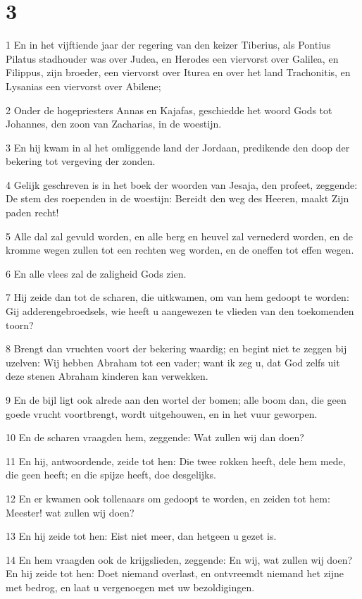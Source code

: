 \chapter{3}

\par 1 En in het vijftiende jaar der regering van den keizer Tiberius, als Pontius Pilatus stadhouder was over Judea, en Herodes een viervorst over Galilea, en Filippus, zijn broeder, een viervorst over Iturea en over het land Trachonitis, en Lysanias een viervorst over Abilene;
\par 2 Onder de hogepriesters Annas en Kajafas, geschiedde het woord Gods tot Johannes, den zoon van Zacharias, in de woestijn.
\par 3 En hij kwam in al het omliggende land der Jordaan, predikende den doop der bekering tot vergeving der zonden.
\par 4 Gelijk geschreven is in het boek der woorden van Jesaja, den profeet, zeggende: De stem des roependen in de woestijn: Bereidt den weg des Heeren, maakt Zijn paden recht!
\par 5 Alle dal zal gevuld worden, en alle berg en heuvel zal vernederd worden, en de kromme wegen zullen tot een rechten weg worden, en de oneffen tot effen wegen.
\par 6 En alle vlees zal de zaligheid Gods zien.
\par 7 Hij zeide dan tot de scharen, die uitkwamen, om van hem gedoopt te worden: Gij adderengebroedsels, wie heeft u aangewezen te vlieden van den toekomenden toorn?
\par 8 Brengt dan vruchten voort der bekering waardig; en begint niet te zeggen bij uzelven: Wij hebben Abraham tot een vader; want ik zeg u, dat God zelfs uit deze stenen Abraham kinderen kan verwekken.
\par 9 En de bijl ligt ook alrede aan den wortel der bomen; alle boom dan, die geen goede vrucht voortbrengt, wordt uitgehouwen, en in het vuur geworpen.
\par 10 En de scharen vraagden hem, zeggende: Wat zullen wij dan doen?
\par 11 En hij, antwoordende, zeide tot hen: Die twee rokken heeft, dele hem mede, die geen heeft; en die spijze heeft, doe desgelijks.
\par 12 En er kwamen ook tollenaars om gedoopt te worden, en zeiden tot hem: Meester! wat zullen wij doen?
\par 13 En hij zeide tot hen: Eist niet meer, dan hetgeen u gezet is.
\par 14 En hem vraagden ook de krijgslieden, zeggende: En wij, wat zullen wij doen? En hij zeide tot hen: Doet niemand overlast, en ontvreemdt niemand het zijne met bedrog, en laat u vergenoegen met uw bezoldigingen.

